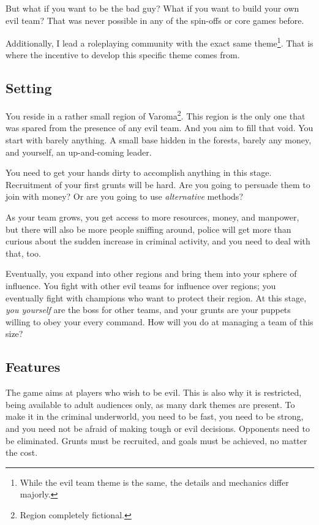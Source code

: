 \documentclass[a4paper,10pt,english]{article}
\begin{document}
But what if you want to be the bad guy? What if you want to build your own evil team? That was never possible in any of the spin-offs or core games before. 

Additionally, I lead a roleplaying community with the exact same theme\footnote{While the evil team theme is the same, the details and mechanics differ majorly.}. That is where the incentive to develop this specific theme comes from.

\subsection*{Setting}
You reside in a rather small region of Varoma\footnote{Region completely fictional.}. This region is the only one that was spared from the presence of any evil team. And you aim to fill that void. You start with barely anything. A small base hidden in the forests, barely any money, and yourself, an up-and-coming leader. 

You need to get your hands dirty to accomplish anything in this stage. Recruitment of your first grunts will be hard. Are you going to persuade them to join with money? Or are you going to use \textit{alternative} methods?

As your team grows, you get access to more resources, money, and manpower, but there will also be more people sniffing around, police will get more than curious about the sudden increase in criminal activity, and you need to deal with that, too.

Eventually, you expand into other regions and bring them into your sphere of influence. You fight with other evil teams for influence over regions; you eventually fight with champions who want to protect their region. At this stage, \textit{you yourself} are the boss for other teams, and your grunts are your puppets willing to obey your every command. How will you do at managing a team of this size?


\subsection*{Features}

The game aims at players who wish to be evil. This is also why it is restricted, being available to adult audiences only, as many dark themes are present. To make it in the criminal underworld, you need to be fast, you need to be strong, and you need not be afraid of making tough or evil decisions. Opponents need to be eliminated. Grunts must be recruited, and goals must be achieved, no matter the cost.  
\end{document}
